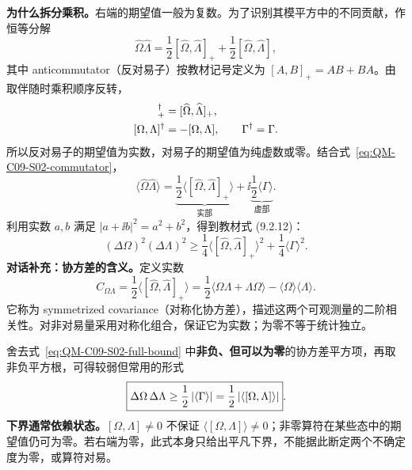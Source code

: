 \textbf{为什么拆分乘积。}右端的期望值一般为复数。为了识别其模平方中的不同贡献，作恒等分解
\begin{equation}
  \widehat\Omega\widehat\Lambda
  =\frac12[\widehat\Omega,\widehat\Lambda]_+
   +\frac12[\widehat\Omega,\widehat\Lambda],
\end{equation}
其中 anticommutator（反对易子）按教材记号定义为 $[A,B]_+=AB+BA$。由取伴随时乘积顺序反转，
\begin{align}
  [\widehat\Omega,\widehat\Lambda]_+^\dagger
   &=[\widehat\Omega,\widehat\Lambda]_+,\notag\\
  [\Omega,\Lambda]^\dagger&=-[\Omega,\Lambda],\qquad
  \Gamma^\dagger=\Gamma.
\end{align}
所以反对易子的期望值为实数，对易子的期望值为纯虚数或零。结合式~\eqref{eq:QM-C09-S02-commutator}，
\begin{equation}
  \langle\widehat\Omega\widehat\Lambda\rangle
  =\underbrace{\frac12\langle[\widehat\Omega,\widehat\Lambda]_+\rangle}_{\text{实部}}
   +\ii\underbrace{\frac12\langle\Gamma\rangle}_{\text{虚部}}.
\end{equation}
利用实数 $a,b$ 满足 $|a+\ii b|^2=a^2+b^2$，得到教材式 (9.2.12)：
\begin{equation}
  \boxed{(\Delta\Omega)^2(\Delta\Lambda)^2
  \ge\frac14\langle[\widehat\Omega,\widehat\Lambda]_+\rangle^2
     +\frac14\langle\Gamma\rangle^2}.
  \label{eq:QM-C09-S02-full-bound}
\end{equation}
\textbf{对话补充：协方差的含义。}定义实数
\begin{equation}
  C_{\Omega\Lambda}
   =\frac12\langle[\widehat\Omega,\widehat\Lambda]_+\rangle
   =\frac12\langle\Omega\Lambda+\Lambda\Omega\rangle
     -\langle\Omega\rangle\langle\Lambda\rangle.
\end{equation}
它称为 symmetrized covariance（对称化协方差），描述这两个可观测量的二阶相关性。对非对易量采用对称化组合，保证它为实数；为零不等于统计独立。

舍去式~\eqref{eq:QM-C09-S02-full-bound} 中\textbf{非负、但可以为零}的协方差平方项，再取非负平方根，可得较弱但常用的形式
\begin{equation}
  \boxed{\Delta\Omega\,\Delta\Lambda
    \ge\frac12\left|\langle\Gamma\rangle\right|
    =\frac12\left|\langle[\Omega,\Lambda]\rangle\right|}.
  \label{eq:QM-C09-S02-robertson}
\end{equation}
\textbf{下界通常依赖状态。}$[\Omega,\Lambda]\ne0$ 不保证 $\langle[\Omega,\Lambda]\rangle\ne0$；非零算符在某些态中的期望值仍可为零。若右端为零，此式本身只给出平凡下界，不能据此断定两个不确定度为零，或算符对易。

